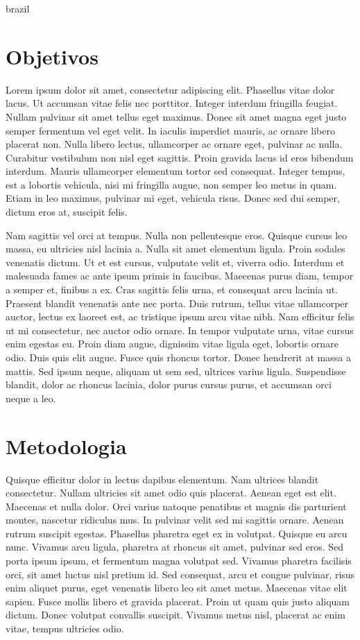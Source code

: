 \begin{otherlanguage*}{brazil}
    \section*{Objetivos}
    Lorem ipsum dolor sit amet, consectetur adipiscing elit. Phasellus vitae
    dolor lacus. Ut accumsan vitae felis nec porttitor. Integer interdum
    fringilla feugiat. Nullam pulvinar sit amet tellus eget maximus. Donec
    sit amet magna eget justo semper fermentum vel eget velit.  In iaculis
    imperdiet mauris, ac ornare libero placerat non. Nulla libero lectus,
    ullamcorper ac ornare eget, pulvinar ac nulla. Curabitur vestibulum non
    nisl eget sagittis. Proin gravida lacus id eros bibendum interdum.
    Mauris ullamcorper elementum tortor sed consequat.  Integer tempus, est
    a lobortis vehicula, nisi mi fringilla augue, non semper leo metus in
    quam. Etiam in leo maximus, pulvinar mi eget, vehicula risus. Donec sed
    dui semper, dictum eros at, suscipit felis.

    Nam sagittis vel orci at tempus. Nulla non pellentesque eros.  Quisque
    cursus leo massa, eu ultricies nisl lacinia a. Nulla sit amet elementum
    ligula.  Proin sodales venenatis dictum. Ut et est cursus, vulputate
    velit et, viverra odio. Interdum et malesuada fames ac ante ipsum primis
    in faucibus. Maecenas purus diam, tempor a semper et, finibus a ex. Cras
    sagittis felis urna, et consequat arcu lacinia ut. Praesent blandit
    venenatis ante nec porta. Duis rutrum, tellus vitae ullamcorper auctor,
    lectus ex laoreet est, ac tristique ipsum arcu vitae nibh. Nam efficitur
    felis ut mi consectetur, nec auctor odio ornare. In tempor vulputate
    urna, vitae cursus enim egestas eu. Proin diam augue, dignissim vitae
    ligula eget, lobortis ornare odio. Duis quis elit augue. Fusce quis
    rhoncus tortor. Donec hendrerit at massa a mattis. Sed ipsum neque,
    aliquam ut sem sed, ultrices varius ligula. Suspendisse blandit, dolor
    ac rhoncus lacinia, dolor purus cursus purus, et accumsan orci neque a
    leo.

    \section*{Metodologia}
    Quisque efficitur dolor in lectus dapibus elementum. Nam ultrices
    blandit consectetur.  Nullam ultricies sit amet odio quis placerat.
    Aenean eget est elit. Maecenas et nulla dolor.  Orci varius natoque
    penatibus et magnis dis parturient montes, nascetur ridiculus mus. In
    pulvinar velit sed mi sagittis ornare. Aenean rutrum suscipit egestas.
    Phasellus pharetra eget ex in volutpat. Quisque eu arcu nunc. Vivamus
    arcu ligula, pharetra at rhoncus sit amet, pulvinar sed eros. Sed porta
    ipsum ipsum, et fermentum magna volutpat sed. Vivamus pharetra facilisis
    orci, sit amet luctus nisl pretium id. Sed consequat, arcu et congue
    pulvinar, risus enim aliquet purus, eget venenatis libero leo sit amet
    metus. Maecenas vitae elit sapien. Fusce mollis libero et gravida
    placerat. Proin ut quam quis justo aliquam dictum. Donec volutpat
    convallis suscipit. Vivamus metus nisl, placerat ac enim vitae, tempus
    ultricies odio.


\end{otherlanguage*}
